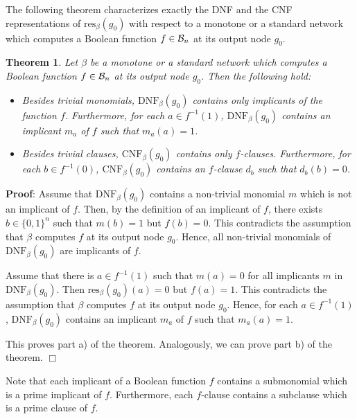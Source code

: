\documentclass[11pt]{article}
\newtheorem{theo}{Theorem}
\begin{document}
The following theorem characterizes exactly the DNF and the CNF representations of $\mbox{res}_{\beta}(g_0)$ with
respect to
a monotone or a standard network which computes a Boolean function $f \in {\cal B}_n$ at its output node $g_0$. 
\begin{theo} \label{theo2.1}
  Let $\beta$ be a monotone or a standard network which computes a Boolean function $f \in {\cal B}_n$ at its
  output node $g_0$. Then the following hold:
  \begin{itemize}
  \item[a)]
    Besides trivial monomials, $\mbox{DNF}_{\beta}(g_0)$ contains only implicants of the function $f$. Furthermore,
    for each $a \in f^{-1}(1)$, $\mbox{DNF}_{\beta}(g_0)$ contains an implicant $m_a$ of $f$ such that $m_a(a) = 1$.
  \item[b)]
    Besides trivial clauses, $\mbox{CNF}_{\beta}(g_0)$ contains only $f$-clauses. Furthermore, for each
    $b \in f^{-1}(0)$, $\mbox{CNF}_{\beta}(g_0)$ contains an $f$-clause $d_b$ such that $d_b(b) = 0$.
  \end{itemize}
\end{theo}
{\bf Proof}:
Assume that $\mbox{DNF}_{\beta}(g_0)$ contains a non-trivial monomial $m$ which is not an implicant of $f$. Then,
by the definition of an implicant of $f$, there exists $b \in \{0,1\}^n$ such that $m(b) = 1$ but $f(b) = 0$.
This contradicts the assumption that $\beta$ computes $f$ at its output node $g_0$. Hence, all non-trivial monomials
of $\mbox{DNF}_{\beta}(g_0)$ are implicants of $f$.

Assume that there is $a \in f^{-1}(1)$ such that $m(a) = 0$ for all implicants $m$ in $\mbox{DNF}_{\beta}(g_0)$. Then
$\mbox{res}_{\beta}(g_0)(a) = 0$ but $f(a) = 1$. This contradicts the assumption that $\beta$ computes $f$ at its
output node $g_0$. Hence, for each $a \in f^{-1}(1)$, $\mbox{DNF}_{\beta}(g_0)$ contains an implicant $m_a$ of $f$ such
that $m_a(a) = 1$.

This proves part a) of the theorem. Analogously, we can prove part b) of the theorem.
$\Box$

\smallskip
Note that each implicant of a Boolean function $f$ contains a submonomial which is a prime implicant of $f$.
Furthermore, each $f$-clause contains a subclause which is a prime clause of $f$.
\end{document}
